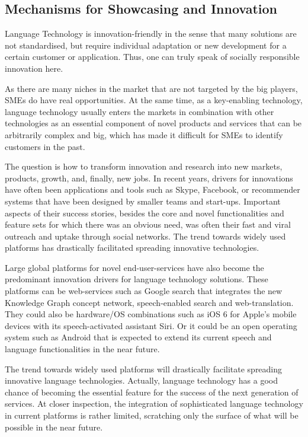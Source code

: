 \documentclass[10pt, plain]{../../metanetpaper}
\begin{document}
\begin{multicols}{2}

\subsection{Mechanisms for Showcasing and Innovation}
\label{sec:powerf-mech-showcasing-and-innovation}

Language Technology is innovation-friendly in the sense that many solutions are not standardised, but require individual adaptation or new development for a certain customer or application. Thus, one can truly speak of socially responsible innovation here.

As there are many niches in the market that are not targeted by the big players, SMEs do have real opportunities. At the same time, as a key-enabling technology, language technology usually enters the markets in combination with other technologies as an essential component of novel products and services that can be arbitrarily complex and big, which has made it difficult for SMEs to identify customers in the past.    

The question is how to transform innovation and research into new markets, products, growth, and, finally, new jobs. In recent years, drivers for innovations have often been applications and tools such as Skype, Facebook, or recommender systems that have been designed by smaller teams and start-ups. Important aspects of their success stories, besides the core and novel functionalities and feature sets for which there was an obvious need, was often their fast and viral outreach and uptake through social networks. The trend towards widely used platforms has drastically facilitated spreading innovative technologies.

Large global platforms for novel end-user-services have also become the predominant innovation drivers for language technology solutions. These platforms can be web-services such as Google search that integrates the new Knowledge Graph concept network, speech-enabled search and web-translation. They could also be hardware/OS combinations such as iOS 6 for Apple’s mobile devices with its speech-activated assistant Siri. Or it could be an open operating system such as Android that is expected to extend its current speech and language functionalities in the near future.

The trend towards widely used platforms will drastically facilitate spreading innovative language technologies. Actually, language technology has a good chance of becoming the essential feature for the success of the next generation of services. At closer inspection, the integration of sophisticated language technology in current platforms is rather limited, scratching only the surface of what will be possible in the near future.


\end{multicols}
\end{document}
